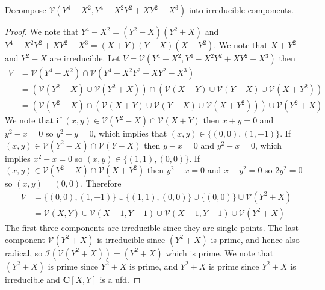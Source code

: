 \documentclass[11pt]{book}
\begin{document}
\begin{problem}
Decompose $\mathcal{V}(Y^4-X^2,Y^4-X^2Y^2+XY^2-X^3)$ into irreducible components. 
\begin{proof}
We note that $Y^4-X^2=(Y^2-X)(Y^2+X)$ and $Y^4-X^2Y^2+XY^2-X^3=(X+Y)(Y-X)(X+Y^2)$. We note that $X+Y^2$ and $Y^2-X$ are irreducible. Let $V=\mathcal{V}(Y^4-X^2,Y^4-X^2Y^2+XY^2-X^3)$ then
\[\begin{aligned}V&=\mathcal{V}(Y^4-X^2)\cap \mathcal{V}(Y^4-X^2Y^2+XY^2-X^3)\\
&=(\mathcal{V}(Y^2-X)\cup\mathcal{V}(Y^2+X))\cap (\mathcal{V}(X+Y)\cup\mathcal{V}(Y-X)\cup\mathcal{V}(X+Y^2))\\
&=(\mathcal{V}(Y^2-X)\cap (\mathcal{V}(X+Y)\cup\mathcal{V}(Y-X)\cup\mathcal{V}(X+Y^2)))\cup \mathcal{V}(Y^2+X)
\end{aligned}
\]
We note that if $(x,y)\in \mathcal{V}(Y^2-X)\cap \mathcal{V}(X+Y)$ then $x+y=0$ and $y^2-x=0$ so $y^2+y=0$, which implies that $(x,y)\in\{(0,0),(1,-1)\}$. If $(x,y)\in \mathcal{V}(Y^2-X)\cap \mathcal{V}(Y-X)$ then $y-x=0$ and $y^2-x=0$, which implies $x^2-x=0$ so $(x,y)\in \{(1,1),(0,0)\}$. If $(x,y)\in \mathcal{V}(Y^2-X)\cap\mathcal{V}(X+Y^2)$ then $y^2-x=0$ and $x+y^2=0$ so $2y^2=0$ so $(x,y)=(0,0)$. Therefore
\[\begin{aligned}V&=\{(0,0),(1,-1)\}\cup\{(1,1),(0,0)\}\cup \{(0,0)\}\cup\mathcal{V}(Y^2+X)\\
&=\mathcal{V}(X,Y)\cup\mathcal{V}(X-1,Y+1)\cup\mathcal{V}(X-1,Y-1)\cup\mathcal{V}(Y^2+X)
\end{aligned}\]
The first three components are irreducible since they are single points. The last component $\mathcal{V}(Y^2+X)$ is irreducible since $(Y^2+X)$ is prime, and hence also radical, so $\mathcal{I}(\mathcal{V}(Y^2+X))=(Y^2+X)$ which is prime. %
We note that $(Y^2+X)$ is prime since $Y^2+X$ is prime, and $Y^2+X$ is prime since $Y^2+X$ is irreducible and $\mathbf C[X,Y]$ is a ufd.
\end{proof}
\end{problem}
\newpage
\end{document}
